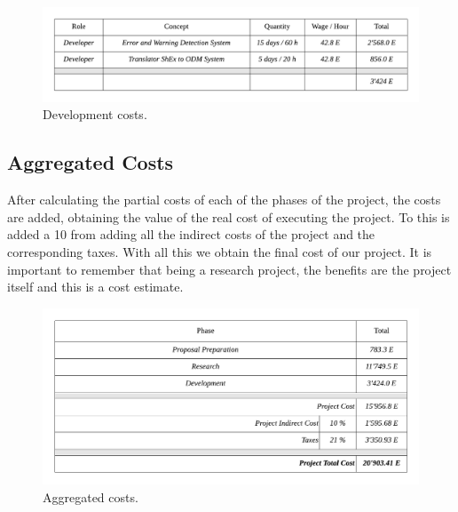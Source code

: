\begin{figure}[h!]
    \includegraphics[width=\textwidth]{images/budget-development.pdf}
    \centering
	\caption[Development costs]{Development costs.}
    \label{fig:budget-development}
\end{figure}

\subsection{Aggregated Costs}
After calculating the partial costs of each of the phases of the project, the costs are added,
obtaining the value of the real cost of executing the project. To this is added a 10%
from adding all the indirect costs of the project and the corresponding taxes. With all this we
obtain the final cost of our project. It is important to remember that being a research project,
the benefits are the project itself and this is a cost estimate.

\begin{figure}[h!]
    \includegraphics[width=\textwidth]{images/budget-general.pdf}
    \centering
	\caption[Aggregated costs]{Aggregated costs.}
    \label{fig:budget-general}
\end{figure}